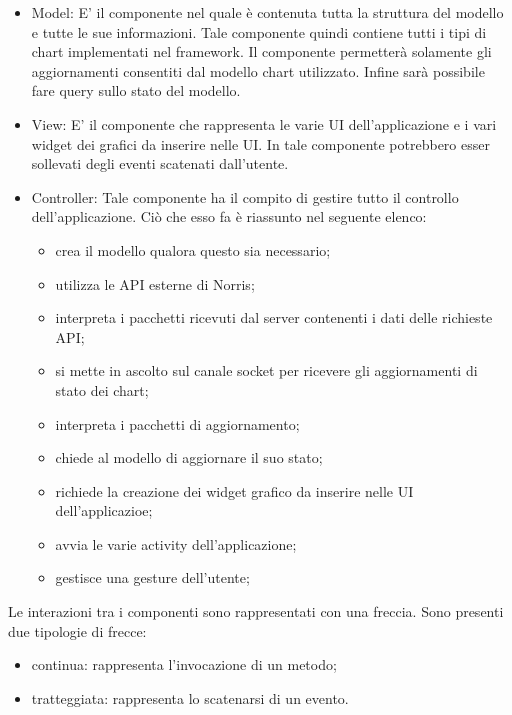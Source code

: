     	\begin{itemize}
            \item{Model:} 
        		E' il componente nel quale è contenuta tutta la struttura del modello e tutte le sue informazioni. Tale componente quindi contiene tutti i tipi di chart implementati nel framework. Il componente permetterà solamente gli aggiornamenti consentiti dal modello chart utilizzato. Infine sarà possibile fare query sullo stato del modello.
        	\item{View:}
        		E' il componente che rappresenta le varie UI dell'applicazione e i vari widget dei grafici da inserire nelle UI. In tale componente potrebbero esser sollevati degli eventi scatenati dall'utente.
        	\item{Controller:}
        		Tale componente ha il compito di gestire tutto il controllo dell'applicazione. Ciò che esso fa è riassunto nel seguente elenco:
        		\begin{itemize}
        			\item crea il modello qualora questo sia necessario;
        			\item utilizza le API esterne di Norris;
        			\item interpreta i pacchetti ricevuti dal server contenenti i dati delle richieste API;
        			\item si mette in ascolto sul canale socket per ricevere gli aggiornamenti di stato dei chart;
        			\item interpreta i pacchetti di aggiornamento;
        			\item chiede al modello di aggiornare il suo stato;
        			\item richiede la creazione dei widget grafico da inserire nelle UI dell'applicazioe;
        			\item avvia le varie activity dell'applicazione;
        			\item gestisce una gesture dell'utente;
        		\end{itemize}
        \end{itemize}
    	Le interazioni tra i componenti sono rappresentati con una freccia. Sono presenti due tipologie di frecce:
    	\begin{itemize}
    			\item{continua: } rappresenta l'invocazione di un metodo;
    			\item{tratteggiata: } rappresenta lo scatenarsi di un evento.
    		\end{itemize}
